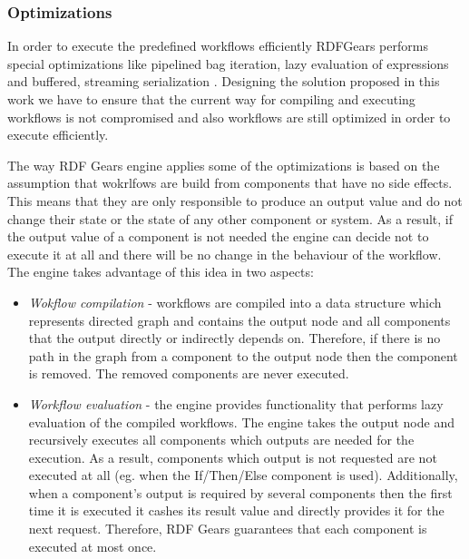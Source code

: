 \subsubsection{Optimizations}

In order to execute the predefined workflows efficiently RDFGears performs special optimizations like pipelined bag iteration, lazy evaluation of expressions and buffered, streaming serialization \cite{feliksik2011}. Designing the solution proposed in this work we have to ensure that the current way for compiling and executing workflows is not compromised and also workflows are still optimized in order to execute efficiently. 

The way RDF Gears engine applies some of the optimizations is based on the assumption that wokrlfows are build from components that have no side effects. This means that they are only responsible to produce an output value and do not change their state or the state of any other component or system. As a result, if the output value of a component is not needed the engine can decide not to execute it at all and there will be no change in the behaviour of the workflow. The engine takes advantage of this idea in two aspects:
	\begin{itemize}
		\item \textit{Wokflow compilation} - workflows are compiled into a data structure which represents directed graph and contains the output node and all components that the output directly or indirectly depends on. Therefore, if there is no path in the graph from a component to the output node then the component is removed. The removed components are never executed.
		
		\item \textit{Workflow evaluation} - the engine provides functionality that performs lazy evaluation of the compiled workflows. The engine takes the output node and recursively executes all components which outputs are needed for the execution. As a result, components which output is not requested are not executed at all (eg. when the If/Then/Else component is used). Additionally, when a component's output is required by several components then the first time it is executed it cashes its result value and directly provides it for the next request. Therefore, RDF Gears guarantees that each component is executed at most once.
\end{itemize}
